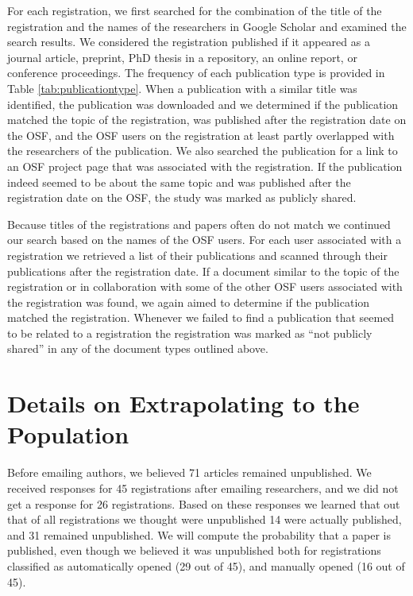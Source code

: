 \documentclass[
  ,jou, a4paper,floatsintext]{apa6}
\begin{document}
For each registration, we first searched for the combination of the title of the registration and the names of the researchers in Google Scholar and examined the search results. We considered the registration published if it appeared as a journal article, preprint, PhD thesis in a repository, an online report, or conference proceedings. The frequency of each publication type is provided in Table \ref{tab:publicationtype}. When a publication with a similar title was identified, the publication was downloaded and we determined if the publication matched the topic of the registration, was published after the registration date on the OSF, and the OSF users on the registration at least partly overlapped with the researchers of the publication. We also searched the publication for a link to an OSF project page that was associated with the registration. If the publication indeed seemed to be about the same topic and was published after the registration date on the OSF, the study was marked as publicly shared.

Because titles of the registrations and papers often do not match we continued our search based on the names of the OSF users. For each user associated with a registration we retrieved a list of their publications and scanned through their publications after the registration date. If a document similar to the topic of the registration or in collaboration with some of the other OSF users associated with the registration was found, we again aimed to determine if the publication matched the registration. Whenever we failed to find a publication that seemed to be related to a registration the registration was marked as ``not publicly shared'' in any of the document types outlined above.

\hypertarget{details-on-extrapolating-to-the-population}{%
\section{Details on Extrapolating to the Population}\label{details-on-extrapolating-to-the-population}}

Before emailing authors, we believed 71 articles remained unpublished. We received responses for 45 registrations after emailing researchers, and we did not get a response for 26 registrations. Based on these responses we learned that out that of all registrations we thought were unpublished 14 were actually published, and 31 remained unpublished. We will compute the probability that a paper is published, even though we believed it was unpublished both for registrations classified as automatically opened (29 out of 45), and manually opened (16 out of 45).
\end{document}
